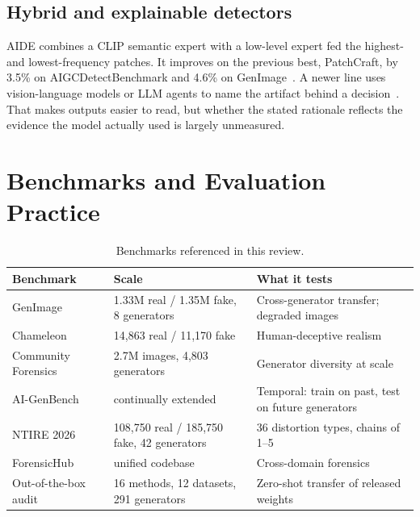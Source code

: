 \documentclass[conference]{IEEEtran}
\begin{document}
\subsection{Hybrid and explainable detectors}
AIDE combines a CLIP semantic expert with a low-level expert fed the highest-
and lowest-frequency patches. It improves on the previous best, PatchCraft,
by 3.5\% on AIGCDetectBenchmark and 4.6\% on GenImage~\cite{yan2025aide}.
A newer line uses vision-language models or LLM agents to name the artifact
behind a decision~\cite{sharma2025mirage,yu2026agentfox}. That makes outputs
easier to read, but whether the stated rationale reflects the evidence the
model actually used is largely unmeasured.

\section{Benchmarks and Evaluation Practice}
\label{sec:benchmarks}

\begin{table}[t]
\caption{Benchmarks referenced in this review.}
\label{tab:benchmarks}
\centering
\footnotesize
\setlength{\tabcolsep}{3pt}
\begin{tabular}{@{}p{2.0cm}p{2.5cm}p{3.3cm}@{}}
\toprule
Benchmark & Scale & What it tests \\
\midrule
GenImage~\cite{zhu2023genimage} & 1.33M real / 1.35M fake, 8 generators & Cross-generator transfer; degraded images \\
Chameleon~\cite{yan2025aide} & 14,863 real / 11,170 fake & Human-deceptive realism \\
Community Forensics~\cite{park2025commfor} & 2.7M images, 4,803 generators & Generator diversity at scale \\
AI-GenBench~\cite{pellegrini2025aigenbench} & continually extended & Temporal: train on past, test on future generators \\
NTIRE 2026~\cite{ntire2026robust} & 108,750 real / 185,750 fake, 42 generators & 36 distortion types, chains of 1--5 \\
ForensicHub~\cite{du2025forensichub} & unified codebase & Cross-domain forensics \\
Out-of-the-box audit~\cite{ren2026outofbox} & 16 methods, 12 datasets, 291 generators & Zero-shot transfer of released weights \\
\bottomrule
\end{tabular}
\end{table}
\end{document}
